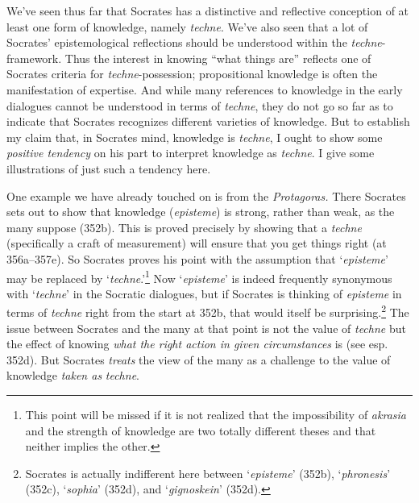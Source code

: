 ﻿\documentclass[11pt]{amsart}
\begin{document}








We've seen thus far that Socrates has a distinctive and reflective conception of at least one form of knowledge, namely \emph{techne}. We've also seen that a lot of Socrates' epistemological reflections should be understood within the \emph{techne}-framework. Thus the interest in knowing ``what things are'' reflects one of Socrates criteria for \emph{techne}-possession; propositional knowledge is often the manifestation of expertise. And while many references to knowledge in the early dialogues cannot be understood in terms of \emph{techne}, they do not go so far as to indicate that Socrates recognizes different varieties of knowledge. But to establish my claim that, in Socrates mind, knowledge is \emph{techne}, I ought to show some \emph{positive tendency} on his part to interpret knowledge as \emph{techne}. I give some illustrations of just such a tendency here.


One example we have already touched on is from the \emph{Protagoras.} There Socrates sets out to show that knowledge (\emph{episteme}) is strong, rather than weak, as the many suppose (352b). This is proved precisely by showing that a \emph{techne} (specifically a craft of measurement) will ensure that you get things right (at 356a--357e). So Socrates proves his point with the assumption that `\emph{episteme}' may be replaced by `\emph{techne}.'\footnote{This point will be missed if it is not realized that the impossibility of \emph{akrasia} and the strength of knowledge are two totally different theses and that neither implies the other.} Now `\emph{episteme}' is indeed frequently synonymous with `\emph{techne}' in the Socratic dialogues, but if Socrates is thinking of \emph{episteme} in terms of \emph{techne} right from the start at 352b, that would itself be surprising.\footnote{Socrates is actually indifferent here between `\emph{episteme}' (352b), `\emph{phronesis}' (352c), `\emph{sophia}' (352d), and `\emph{gignoskein}' (352d).} The issue between Socrates and the many at that point is not the value of \emph{techne} but the effect of knowing \emph{what the right action in given circumstances} is (see esp. 352d). But Socrates \emph{treats} the view of the many as a challenge to the value of knowledge \emph{taken as} \emph{techne}.
\end{document}
